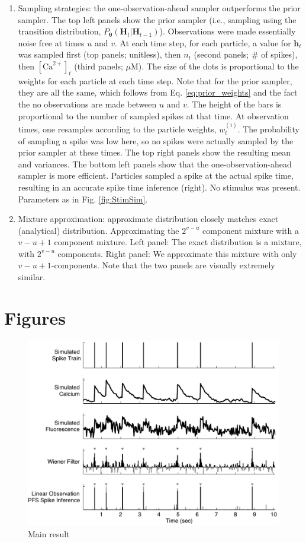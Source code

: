 \documentclass[10pt]{article}
\providecommand{\ve}[1]{\boldsymbol{#1}}
\providecommand{\ve}[1]{\boldsymbol{#1}}
\newcommand{\thetn}{\ve{\theta}}
\newcommand{\p}{P_{\thetn}}
\newcommand{\Ca}{[\text{Ca}^{2+}]}
\begin{document}
\begin{enumerate}
\item Sampling strategies: the one-observation-ahead sampler outperforms the prior sampler. The top left panels show the prior sampler (i.e., sampling using the transition distribution, $\p(\ve{H}_t | \ve{H}_{t-1})$).  Observations were made essentially noise free at times $u$ and $v$. At each time step, for each particle, a value for $\ve{h}_t$ was sampled first (top panels; unitless), then $n_t$ (second panels; $\#$ of spikes), then $\Ca_t$ (third panels; $\mu$M).  The size of the dots is proportional to the weights for each particle at each time step.  Note that for the prior sampler, they are all the same, which follows from Eq. \ref{eq:prior_weights} and the fact the no observations are made between $u$ and $v$.  The height of the bars is proportional to the number of sampled spikes at that time. At observation times, one resamples according to the particle weights, $w_t^{(i)}$. The probability of sampling a spike was low here, so no spikes were actually sampled by the prior sampler at these times.  The top right panels show the resulting mean and variances.  The bottom left panels show that the one-observation-ahead sampler is more efficient. Particles sampled a spike at the actual spike time, resulting in an accurate spike time inference (right).  No stimulus was present. Parameters as in Fig. \ref{fig:StimSim}.  
\item Mixture approximation: approximate distribution closely matches exact (analytical) distribution. Approximating the $2^{v-u}$ component mixture with a $v-u+1$ component mixture. Left panel:  The exact distribution is a mixture, with $2^{v-u}$ components. Right panel:  We approximate this mixture with only $v-u+1$-components. Note that the two panels are visually extremely similar. 
\end{enumerate}

\clearpage \newpage
\section*{Figures}

\begin{figure}[h]
\includegraphics[width=1.0\linewidth]{NoisySim_bw}
\caption{Main result}  \label{fig:noisy}
\end{figure}
\end{document}
